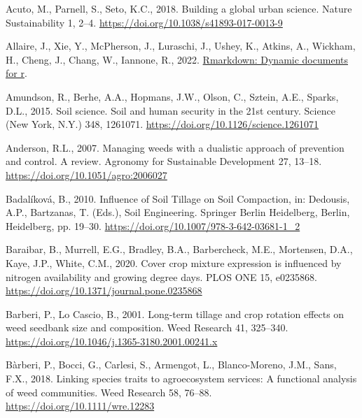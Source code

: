 \documentclass[
  12pt,
]{article}
\newlength{\cslhangindent}
\newlength{\cslentryspacingunit} %
\newenvironment{CSLReferences}[2] %
 {%
  \setlength{\parindent}{0pt}
  \ifodd #1
  \let\oldpar\par
  \def\par{\hangindent=\cslhangindent\oldpar}
  \fi
  \setlength{\parskip}{#2\cslentryspacingunit}
 }%
 {}
\begin{document}
\hypertarget{refs}{}
\begin{CSLReferences}{1}{0}
\leavevmode{}%
Acuto, M., Parnell, S., Seto, K.C., 2018. Building a global urban science. Nature Sustainability 1, 2--4. \url{https://doi.org/10.1038/s41893-017-0013-9}

\leavevmode{}%
Allaire, J., Xie, Y., McPherson, J., Luraschi, J., Ushey, K., Atkins, A., Wickham, H., Cheng, J., Chang, W., Iannone, R., 2022. \href{https://github.com/rstudio/rmarkdown}{Rmarkdown: Dynamic documents for r}.

\leavevmode{}%
Amundson, R., Berhe, A.A., Hopmans, J.W., Olson, C., Sztein, A.E., Sparks, D.L., 2015. Soil science. {Soil} and human security in the 21st century. Science (New York, N.Y.) 348, 1261071. \url{https://doi.org/10.1126/science.1261071}

\leavevmode{}%
Anderson, R.L., 2007. Managing weeds with a dualistic approach of prevention and control. {A} review. Agronomy for Sustainable Development 27, 13--18. \url{https://doi.org/10.1051/agro:2006027}

\leavevmode{}%
Badalíková, B., 2010. Influence of {Soil Tillage} on {Soil Compaction}, in: Dedousis, A.P., Bartzanas, T. (Eds.), Soil {Engineering}. {Springer Berlin Heidelberg}, {Berlin, Heidelberg}, pp. 19--30. \url{https://doi.org/10.1007/978-3-642-03681-1_2}

\leavevmode{}%
Baraibar, B., Murrell, E.G., Bradley, B.A., Barbercheck, M.E., Mortensen, D.A., Kaye, J.P., White, C.M., 2020. Cover crop mixture expression is influenced by nitrogen availability and growing degree days. PLOS ONE 15, e0235868. \url{https://doi.org/10.1371/journal.pone.0235868}

\leavevmode{}%
Barberi, P., Lo Cascio, B., 2001. Long-term tillage and crop rotation effects on weed seedbank size and composition. Weed Research 41, 325--340. \url{https://doi.org/10.1046/j.1365-3180.2001.00241.x}

\leavevmode{}%
Bàrberi, P., Bocci, G., Carlesi, S., Armengot, L., Blanco-Moreno, J.M., Sans, F.X., 2018. Linking species traits to agroecosystem services: A functional analysis of weed communities. Weed Research 58, 76--88. \url{https://doi.org/10.1111/wre.12283}


\end{CSLReferences}
\end{document}
